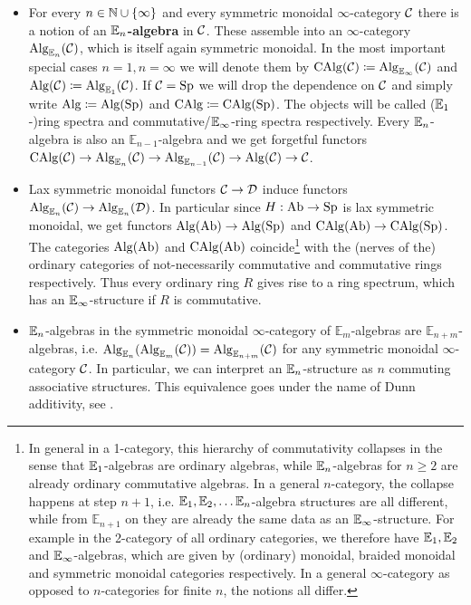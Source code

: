 \begin{itemize}
    \item For every $n\in\mathbb{N}\cup\{\infty\}$ and every symmetric monoidal $\infty$-category $\mathcal{C}$ there is a notion of an \textbf{$\mathbb{E}_n$-algebra} in $\mathcal{C}$. 
    These assemble into an $\infty$-category $\operatorname{Alg}_{\mathbb{E}_n}(\mathcal{C})$, which is itself again symmetric monoidal. 
    In the most important special cases $n=1,n=\infty$ we will denote them by $\operatorname{CAlg}(\mathcal{C})\coloneqq \operatorname{Alg}_{\mathbb{E}_\infty}(\mathcal{C})$ and $\operatorname{Alg}(\mathcal{C})\coloneqq \operatorname{Alg}_{\mathbb{E}_1}(\mathcal{C})$. If $\mathcal{C}=\operatorname{Sp}$ we will drop the dependence on $\mathcal{C}$ and simply write $\operatorname{Alg}\coloneqq\operatorname{Alg}(\operatorname{Sp})$ and $\operatorname{CAlg}\coloneqq\operatorname{CAlg}(\operatorname{Sp})$. The objects will be called ($\mathbb{E}_1$-)ring spectra and commutative/$\mathbb{E}_\infty$-ring spectra respectively.
    Every $\mathbb{E}_n$-algebra is also an $\mathbb{E}_{n-1}$-algebra and we get forgetful functors $\operatorname{CAlg}(\mathcal{C})\rightarrow \operatorname{Alg}_{\mathbb{E}_n}(\mathcal{C})\rightarrow \operatorname{Alg}_{\mathbb{E}_{n-1}}(\mathcal{C})\rightarrow \operatorname{Alg}(\mathcal{C})\rightarrow \mathcal{C}$. 
    \item Lax symmetric monoidal functors $\mathcal{C}\rightarrow\mathcal{D}$ induce functors $\operatorname{Alg}_{\mathbb{E}_n}(\mathcal{C})\rightarrow \operatorname{Alg}_{\mathbb{E}_n}(\mathcal{D})$. In particular since $H:\operatorname{Ab}\rightarrow\operatorname{Sp}$ is lax symmetric monoidal, we get functors $\operatorname{Alg}(\operatorname{Ab})\rightarrow \operatorname{Alg}(\operatorname{Sp})$ and  $\operatorname{CAlg}(\operatorname{Ab})\rightarrow \operatorname{CAlg}(\operatorname{Sp})$. The categories $\operatorname{Alg}(\operatorname{Ab})$ and $\operatorname{CAlg}(\operatorname{Ab})$ coincide\footnote{In general in a 1-category, this hierarchy of commutativity collapses in the sense that $\mathbb{E}_1$-algebras are ordinary algebras, while $\mathbb{E}_n$-algebras for $n\geq 2$ are already ordinary commutative algebras.
    In a general $n$-category, the collapse happens at step $n+1$, i.e. $\mathbb{E}_1,\mathbb{E}_2,\dots \mathbb{E}_n$-algebra structures are all different, while from $\mathbb{E}_{n+1}$ on they are already the same data as an $\mathbb{E}_\infty$-structure. For example in the 2-category of all ordinary categories, we therefore have $\mathbb{E}_1,\mathbb{E}_2$ and $\mathbb{E}_\infty$-algebras, which are given by (ordinary) monoidal, braided monoidal and symmetric monoidal categories respectively. In a general $\infty$-category as opposed to $n$-categories for finite $n$, the notions all differ.} with the (nerves of the) ordinary categories of not-necessarily commutative and commutative rings respectively. Thus every ordinary ring $R$ gives rise to a ring spectrum, which has an $\mathbb{E}_\infty$-structure if $R$ is commutative.
    \item $\mathbb{E}_n$-algebras in the symmetric monoidal $\infty$-category of $\mathbb{E}_m$-algebras are $\mathbb{E}_{n+m}$-algebras, i.e. $\operatorname{Alg}_{\mathbb{E}_n}(\operatorname{Alg}_{\mathbb{E}_m}(\mathcal{C}))=\operatorname{Alg}_{\mathbb{E}_{n+m}}(\mathcal{C})$ for any symmetric monoidal $\infty$-category $\mathcal{C}$. In particular, we can interpret an $\mathbb{E}_n$-structure as $n$ commuting associative structures. This equivalence goes under the name of Dunn additivity, see \cite[Theorem~5.1.2.2]{lurie2017higher}.

\end{itemize}
